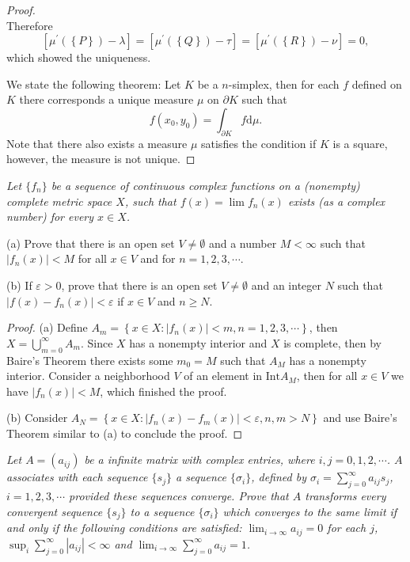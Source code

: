 \begin{proof}
$$$$
Therefore 
$$
\left[ \mu ^{\prime}\left( \left\{ P \right\} \right) -\lambda \right] =\left[ \mu ^{\prime}\left( \left\{ Q \right\} \right) -\tau \right] =\left[ \mu ^{\prime}\left( \left\{ R \right\} \right) -\nu \right] =0,
$$
which showed the uniqueness.\par
We state the following theorem: Let $K$ be a $n$-simplex, then for each $f$ defined on $K$ there corresponds a unique measure $\mu$ on $\partial K$ such that 
$$
f\left( x_0,y_0 \right) =\int_{\partial K}{f\mathrm{d}\mu}.
$$
Note that there also exists a measure $\mu$ satisfies the condition if $K$ is a square, however, the measure is not unique.
\end{proof}
\begin{problem}\em
Let $\{f_n\}$ be a sequence of continuous complex functions on a (nonempty) complete metric space $X$, such that $f(x)=\lim f_n(x)$ exists (as a complex number) for every $x\in X$.\par
(a) Prove that there is an open set $V\ne\emptyset$ and a number $M<\infty$ such that $|f_n(x)|<M$ for all $x\in V$ and for $n=1,2,3,\cdots$.\par
(b) If $\varepsilon>0$, prove that there is an open set $V\ne\emptyset$ and an integer $N$ such that $|f(x)-f_n(x)|<\varepsilon$ if $x\in V$ and $n\ge N$.
\end{problem}
\begin{proof}
(a) Define $A_m=\left\{ x\in X:\left| f_n\left( x \right) \right|<m,n=1,2,3,\cdots \right\} $, then $X=\bigcup_{m=0}^{\infty}{A_m}$. Since $X$ has a nonempty interior and $X$ is complete, then by Baire's Theorem there exists some $m_0=M$ such that $A_M$ has a nonempty interior. Consider a neighborhood $V$ of an element in $\mathrm{Int}A_M$, then for all $x\in V$ we have $|f_n(x)|<M$, which finished the proof.\par
(b) Consider $A_N=\left\{ x\in X:\left| f_n\left( x \right) -f_m\left( x \right) \right|<\varepsilon ,n,m>N \right\} $ and use Baire's Theorem similar to (a) to conclude the proof.
\end{proof}
\begin{problem}\em
Let $A=(a_{ij})$ be a infinite matrix with complex entries, where $i,j=0,1,2,\cdots$. $A$ associates with each sequence $\{s_j\}$ a sequence $\{\sigma_i\}$, defined by $\sigma_i=\sum_{j=0}^\infty a_{ij}s_j$, $i=1,2,3,\cdots$ provided these sequences converge. Prove that $A$ transforms every convergent sequence $\{s_j\}$ to a sequence $\{\sigma_i\}$ which converges to the same limit if and only if the following conditions are satisfied: $\lim_{i\to\infty}a_{ij}=0$ for each $j$, $\sup_i\sum_{j=0}^\infty|a_{ij}|<\infty$ and $\lim_{i\to\infty}\sum_{j=0}^\infty a_{ij}=1$.
\end{problem}
